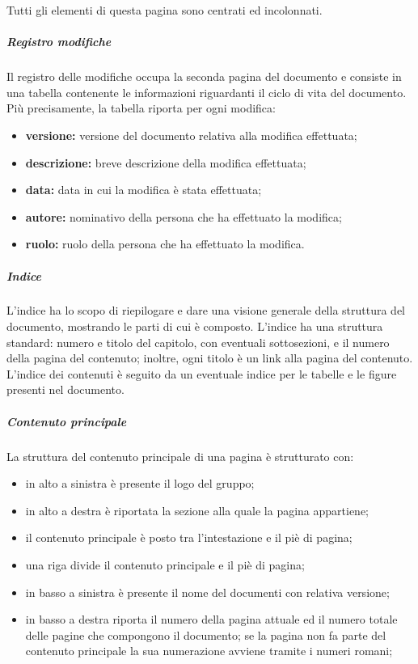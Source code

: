 					Tutti gli elementi di questa pagina sono centrati ed incolonnati.
				\subparagraph{Registro modifiche}
				\label{par: Registro modifiche}
					Il registro delle modifiche occupa la seconda pagina del documento e consiste in una tabella contenente le informazioni riguardanti il ciclo di vita del documento. Più precisamente, la tabella riporta per ogni modifica:
					\begin{itemize}
						\item \textbf{versione:} versione del documento relativa alla modifica effettuata;
						\item \textbf{descrizione:} breve descrizione della modifica effettuata;
						\item \textbf{data:} data in cui la modifica è stata effettuata;
						\item \textbf{autore:} nominativo della persona che ha effettuato la modifica;
						\item \textbf{ruolo:} ruolo della persona che ha effettuato la modifica.
					\end{itemize}
				\subparagraph{Indice}
					L'indice ha lo scopo di riepilogare e dare una visione generale della struttura del documento, mostrando le parti di cui è composto. L'indice ha una struttura standard: numero e titolo del capitolo, con eventuali sottosezioni, e il numero della pagina del contenuto; inoltre, ogni titolo è un link alla pagina del contenuto. L'indice dei contenuti è seguito da un eventuale indice per le tabelle e le figure presenti nel documento.
				\subparagraph{Contenuto principale}
					La struttura del contenuto principale di una pagina è strutturato con:
						\begin{itemize}
							\item in alto a sinistra è presente il logo del gruppo;
							\item in alto a destra è riportata la sezione alla quale la pagina appartiene;
							\item il contenuto principale è posto tra l'intestazione e il piè di pagina;
							\item una riga divide il contenuto principale e il piè di pagina;
							\item in basso a sinistra è presente il nome del documenti con relativa versione;
							\item in basso a destra riporta il numero della pagina attuale ed il numero totale delle pagine che compongono il documento; se la pagina non fa parte del contenuto principale la sua numerazione avviene tramite i numeri romani;
						\end{itemize}
